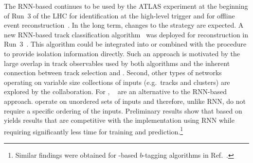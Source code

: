 The RNN-based \tauid continues to be used by the ATLAS experiment at the
beginning of Run~3 of the LHC for identification at the high-level trigger and
for offline event reconstruction~\cite{ATL-PHYS-PUB-2022-044}. In the long term,
changes to the \tauid strategy are expected. A new RNN-based \tauhadvis track
classification algorithm~\cite{Maerker:2021hro} was deployed for \tauhadvis
reconstruction in Run~3~\cite{ATL-PHYS-PUB-2022-044}. This algorithm could be
integrated into or combined with the \tauid procedure to provide isolation
information directly. Such an approach is motivated by the large overlap in
track observables used by both algorithms and the inherent connection between
\tauhadvis track selection and \tauid. Second, other types of networks operating
on variable size collections of inputs (e.g.\ tracks and clusters) are explored
by the collaboration. For \tauid, \deepsets~\cite{NIPS2017_f22e4747} are an
alternative to the RNN-based approach. \deepsets operate on unordered sets of
inputs and therefore, unlike RNN, do not require a specific ordering of the
inputs. Preliminary results show that \tauid based on \deepsets yields results
that are competitive with the implementation using RNN while requiring
significantly less time for training and prediction.\footnote{Similar findings
  were obtained for \deepsets-based $b$-tagging algorithms in
  Ref.~\cite{ATL-PHYS-PUB-2020-014}.}



